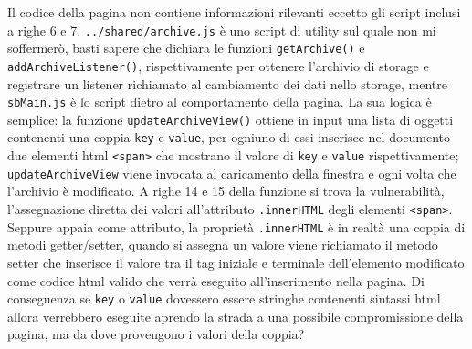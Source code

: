 \documentclass{sapthesis}
\newcommand{\code}[1]{\texttt{#1}}
\newcommand{\file}[1]{\code{#1}}
\newcommand{\attr}[1]{\code{.#1}}
\begin{document}
        Il codice della pagina non contiene informazioni rilevanti eccetto gli script inclusi
        a righe 6 e 7. \file{../shared/archive.js} è uno script di utility sul quale non mi soffermerò, basti sapere
        che dichiara le funzioni \code{getArchive()} e \code{addArchiveListener()}, rispettivamente
        per ottenere l'archivio di storage e registrare un listener richiamato al cambiamento dei
        dati nello storage, mentre \file{sbMain.js} è lo script dietro al comportamento della
        pagina. La sua logica è semplice: la funzione \code{updateArchiveView()} ottiene in input
        una lista di oggetti contenenti una coppia \code{key} e \code{value}, per ogniuno di essi
        inserisce nel documento due elementi html \code{<span>} che mostrano il valore di \code{key}
        e \code{value} rispettivamente; \code{updateArchiveView} viene invocata al caricamento
        della finestra e ogni volta che l'archivio è modificato. A righe 14 e 15 della funzione 
        si trova la vulnerabilità, l'assegnazione diretta dei valori all'attributo \attr{innerHTML}
        degli elementi \code{<span>}.\\
        Seppure appaia come attributo, la proprietà \attr{innerHTML} è in realtà una coppia di metodi
        getter/setter, quando si assegna un valore viene richiamato il metodo setter che inserisce
        il valore tra il tag iniziale e terminale dell'elemento modificato come codice html valido
        che verrà eseguito all'inserimento nella pagina. Di conseguenza se \code{key} o \code{value}
        dovessero essere stringhe contenenti sintassi html allora verrebbero eseguite aprendo la
        strada a una possibile compromissione della pagina, ma da dove provengono i valori della
        coppia?
\end{document}
